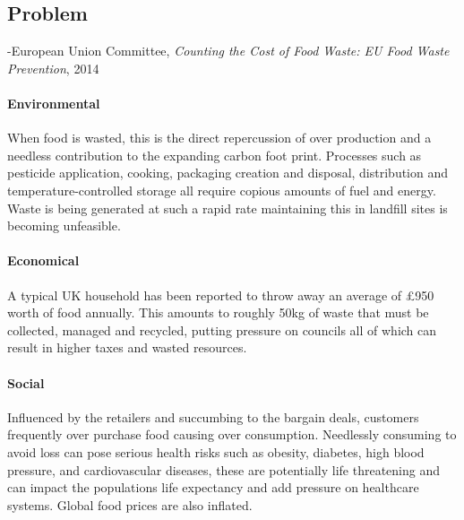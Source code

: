\documentclass[a4paper, 11pt]{article}
\begin{document}
\vspace{\baselineskip}

\subsection{Problem}


\begin{quoting}
-European Union Committee, \emph{Counting the Cost of Food Waste: EU Food Waste Prevention}, 2014\cite{FoodWaste}
\end{quoting}

\paragraph{Environmental}When food is wasted, this is the direct repercussion of over production and a needless contribution to the expanding carbon foot print. Processes such as pesticide application, cooking, packaging creation and disposal, distribution and temperature-controlled storage all require copious amounts of fuel and energy. Waste is being generated at such a rapid rate maintaining this in landfill sites is becoming unfeasible.\cite{waste}

\paragraph{Economical}A typical UK household has been reported to throw away an average of \pounds950 worth of food annually. This amounts to roughly 50kg of waste that must be collected, managed and recycled, putting pressure on councils all of which can result in higher taxes and wasted resources.\cite{FoodWaste}

\paragraph{Social} Influenced by the retailers and succumbing to the bargain deals, customers frequently over purchase food causing over consumption. Needlessly consuming to avoid loss can pose serious health risks such as obesity, diabetes, high blood pressure, and cardiovascular diseases, these are potentially life threatening and can impact the populations life expectancy and add pressure on healthcare systems. Global food prices are also inflated.\cite{obesity}
\end{document}
